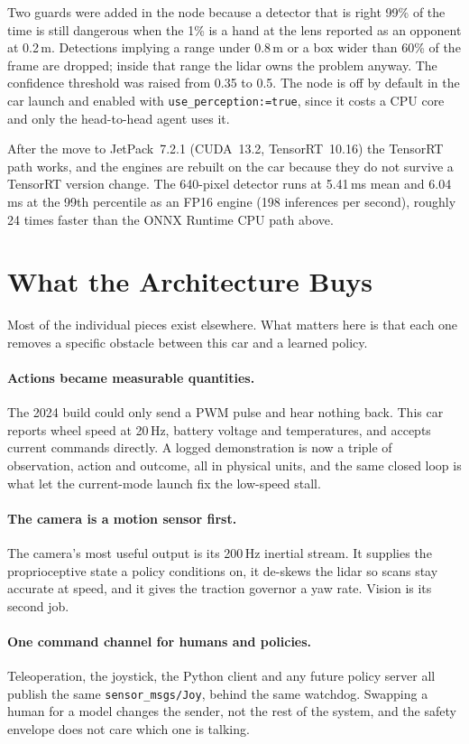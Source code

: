 \documentclass[12pt]{article}
\begin{document}
Two guards were added in the node because a detector that is right 99\% of the time is
still dangerous when the 1\% is a hand at the lens reported as an opponent at 0.2\,m.
Detections implying a range under 0.8\,m or a box wider than 60\% of the frame are
dropped; inside that range the lidar owns the problem anyway. The confidence threshold
was raised from 0.35 to 0.5. The node is off by default in the car launch and enabled
with \texttt{use\_perception:=true}, since it costs a CPU core and only the head-to-head
agent uses it.

After the move to JetPack~7.2.1 (CUDA~13.2, TensorRT~10.16) the TensorRT path works, and
the engines are rebuilt on the car because they do not survive a TensorRT version change. The
640-pixel detector runs at 5.41\,ms mean and 6.04\,ms at the 99th percentile as an FP16 engine
(198 inferences per second), roughly 24 times faster than the ONNX Runtime CPU path above.

\section*{What the Architecture Buys}

Most of the individual pieces exist elsewhere. What matters here is that each one
removes a specific obstacle between this car and a learned policy.

\paragraph{Actions became measurable quantities.} The 2024 build could only send a PWM
pulse and hear nothing back. This car reports wheel speed at 20\,Hz, battery voltage and
temperatures, and accepts current commands directly. A logged demonstration is now a
triple of observation, action and outcome, all in physical units, and the same closed
loop is what let the current-mode launch fix the low-speed stall.

\paragraph{The camera is a motion sensor first.} The camera's most useful output is
its 200\,Hz inertial stream. It supplies the proprioceptive state a policy conditions on,
it de-skews the lidar so scans stay accurate at speed, and it gives the traction governor
a yaw rate. Vision is its second job.

\paragraph{One command channel for humans and policies.} Teleoperation, the joystick,
the Python client and any future policy server all publish the same
\texttt{sensor\_msgs/Joy}, behind the same watchdog. Swapping a human for a model changes
the sender, not the rest of the system, and the safety envelope does not care which one
is talking.
\end{document}
